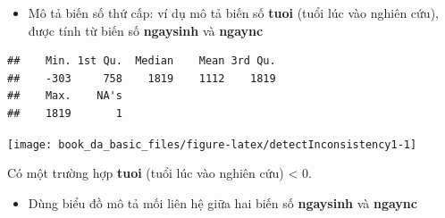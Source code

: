 \documentclass[]{tufte-book}
\newenvironment{Shaded}{}{}
\newcommand{\CommentTok}[1]{\textcolor[rgb]{0.38,0.63,0.69}{\textit{#1}}}
\newcommand{\DataTypeTok}[1]{\textcolor[rgb]{0.56,0.13,0.00}{#1}}
\newcommand{\DecValTok}[1]{\textcolor[rgb]{0.25,0.63,0.44}{#1}}
\newcommand{\KeywordTok}[1]{\textcolor[rgb]{0.00,0.44,0.13}{\textbf{#1}}}
\newcommand{\NormalTok}[1]{#1}
\newcommand{\OperatorTok}[1]{\textcolor[rgb]{0.40,0.40,0.40}{#1}}
\newcommand{\StringTok}[1]{\textcolor[rgb]{0.25,0.44,0.63}{#1}}
\providecommand{\tightlist}{%
  \setlength{\itemsep}{0pt}\setlength{\parskip}{0pt}}
\begin{document}
\begin{itemize}
\tightlist
\item
  Mô tả biến số thứ cấp: ví dụ mô tả biến số \textbf{tuoi} (tuổi lúc vào nghiên cứu), được tính từ biến số \textbf{ngaysinh} và \textbf{ngaync}
\end{itemize}

\begin{Shaded}
\end{Shaded}

\begin{verbatim}
##    Min. 1st Qu.  Median    Mean 3rd Qu. 
##    -303     758    1819    1112    1819 
##    Max.    NA's 
##    1819       1
\end{verbatim}

\begin{Shaded}
\end{Shaded}

\begin{center}\texttt{[image: book\_da\_basic\_files/figure-latex/detectInconsistency1-1]} \end{center}

Có một trường hợp \textbf{tuoi} (tuổi lúc vào nghiên cứu) \textless{} 0.

\begin{itemize}
\tightlist
\item
  Dùng biểu đồ mô tả mối liên hệ giữa hai biến số \textbf{ngaysinh} và \textbf{ngaync}
\end{itemize}

\begin{Shaded}
\end{Shaded}
\end{document}
